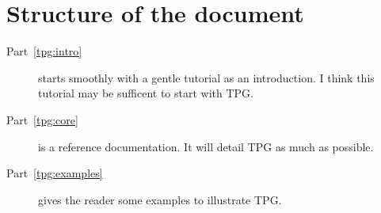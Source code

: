 \section{Structure of the document}

\begin{description}
\item [Part~\ref{tpg:intro}]
starts smoothly with a gentle tutorial as an introduction.
I think this tutorial may be sufficent to start with TPG.
\item [Part~\ref{tpg:core}]
is a reference documentation. It will detail TPG as much as possible.
\item [Part~\ref{tpg:examples}]
gives the reader some examples to illustrate TPG.
\end{description}
